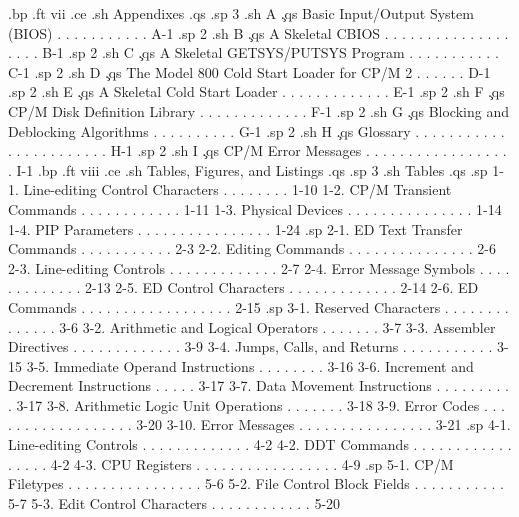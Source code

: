 .bp
.ft                                vii
.ce
.sh
Appendixes
.qs
.sp 3
.sh
A  \c
.qs
Basic Input/Output System (BIOS)  . . . . . . . . . . .   A-1
.sp 2
.sh
B  \c
.qs
A Skeletal CBIOS  . . . . . . . . . . . . . . . . . . .   B-1
.sp 2
.sh
C  \c
.qs
A Skeletal GETSYS/PUTSYS Program  . . . . . . . . . . .   C-1
.sp 2
.sh
D  \c
.qs
The Model 800 Cold Start Loader for CP/M 2  . . . . . .   D-1
.sp 2
.sh
E  \c
.qs
A Skeletal Cold Start Loader  . . . . . . . . . . . . .   E-1
.sp 2
.sh
F  \c
.qs
CP/M Disk Definition Library  . . . . . . . . . . . . .   F-1
.sp 2
.sh
G  \c
.qs
Blocking and Deblocking Algorithms  . . . . . . . . . .   G-1
.sp 2
.sh
H  \c
.qs
Glossary  . . . . . . . . . . . . . . . . . . . . . . .   H-1
.sp 2
.sh
I  \c
.qs
CP/M Error Messages . . . . . . . . . . . . . . . . . .   I-1
.bp
.ft                                viii
.ce
.sh
Tables, Figures, and Listings
.qs
.sp 3
.sh
Tables
.qs
.sp
     1-1.   Line-editing Control Characters . . . . . . . .  1-10
     1-2.   CP/M Transient Commands . . . . . . . . . . . .  1-11
     1-3.   Physical Devices  . . . . . . . . . . . . . . .  1-14
     1-4.   PIP Parameters  . . . . . . . . . . . . . . . .  1-24
.sp
     2-1.   ED Text Transfer Commands . . . . . . . . . . .   2-3
     2-2.   Editing Commands  . . . . . . . . . . . . . . .   2-6
     2-3.   Line-editing Controls . . . . . . . . . . . . .   2-7
     2-4.   Error Message Symbols . . . . . . . . . . . . .  2-13
     2-5.   ED Control Characters . . . . . . . . . . . . .  2-14
     2-6.   ED Commands . . . . . . . . . . . . . . . . . .  2-15
.sp
     3-1.   Reserved Characters . . . . . . . . . . . . . .   3-6
     3-2.   Arithmetic and Logical Operators  . . . . . . .   3-7
     3-3.   Assembler Directives  . . . . . . . . . . . . .   3-9
     3-4.   Jumps, Calls, and Returns . . . . . . . . . . .  3-15
     3-5.   Immediate Operand Instructions  . . . . . . . .  3-16
     3-6.   Increment and Decrement Instructions  . . . . .  3-17
     3-7.   Data Movement Instructions  . . . . . . . . . .  3-17
     3-8.   Arithmetic Logic Unit Operations  . . . . . . .  3-18
     3-9.   Error Codes . . . . . . . . . . . . . . . . . .  3-20
     3-10.  Error Messages  . . . . . . . . . . . . . . . .  3-21
.sp
     4-1.   Line-editing Controls . . . . . . . . . . . . .   4-2
     4-2.   DDT Commands  . . . . . . . . . . . . . . . . .   4-2
     4-3.   CPU Registers . . . . . . . . . . . . . . . . .   4-9
.sp
     5-1.   CP/M Filetypes  . . . . . . . . . . . . . . . .   5-6
     5-2.   File Control Block Fields . . . . . . . . . . .   5-7
     5-3.   Edit Control Characters . . . . . . . . . . . .  5-20
